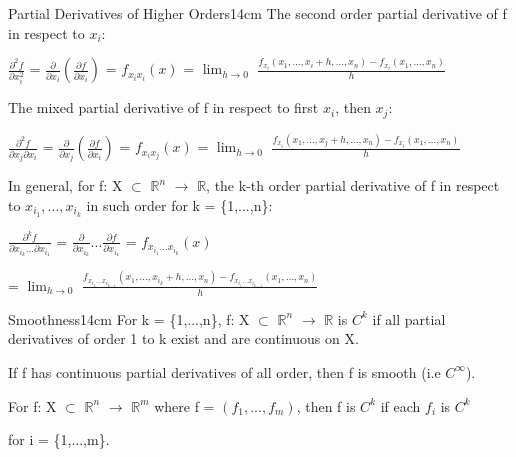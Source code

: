     \begin{definition}{Partial Derivatives of Higher Orders}{14cm}
        The {\color{lblue} second order partial derivative} of f
        in respect to $x_i$:

        \hspace{0.5cm}
        $\frac{\partial^2 f}{\partial x_i^2}$
        = $\frac{\partial}{\partial x_i} (\frac{\partial f}{\partial x_i})$
        = $f_{x_ix_i}(x)$
        = $\lim_{h \rightarrow 0}$
            $\frac{f_{x_i}(x_1,...,x_i+h,...,x_n) - f_{x_i}(x_1,...,x_n)}{h}$

        \vspace{0.3cm}

        The {\color{lblue} mixed partial derivative} of f
        in respect to first $x_i$, then $x_j$:

        \hspace{0.5cm}
        $\frac{\partial^2 f}{\partial x_j \partial x_i}$
        = $\frac{\partial}{\partial x_j} (\frac{\partial f}{\partial x_i})$
        = $f_{x_ix_j}(x)$
        = $\lim_{h \rightarrow 0}$
            $\frac{f_{x_i}(x_1,...,x_j+h,...,x_n) - f_{x_i}(x_1,...,x_n)}{h}$

        \vspace{0.3cm}
        
        In general, for f: X $\subset$ $\mathbb{R}^n$ $\rightarrow$ $\mathbb{R}$,
        the k-th order partial derivative of f in respect to
        $x_{i_1},...,x_{i_k}$ in such order for k = \{1,...,n\}:

        \hspace{0.5cm}
        $\frac{\partial^k f}{\partial x_{i_k} ... \partial x_{i_1}}$
        = $\frac{\partial}{\partial x_{i_k}} ... \frac{\partial f}{\partial x_{i_1}}$
        = $f_{x_{i_1}...x_{i_k}}(x)$

        \hspace{0.5cm}
        = $\lim_{h \rightarrow 0}$
            $\frac{f_{x_{i_1}...x_{i_{k-1}}}(x_1,...,x_{i_k}+h,...,x_n)
                    - f_{x_{i_1}...x_{i_{k-1}}}(x_1,...,x_n)}{h}$
    \end{definition}

    \vspace{0.5cm}



    \begin{definition}{Smoothness}{14cm}
        For k = \{1,...,n\},
        f: X $\subset$ $\mathbb{R}^n$ $\rightarrow$ $\mathbb{R}$ is $C^k$
        if all partial derivatives of order 1 to k exist and are continuous
        on X.

        \vspace{0.3cm}

        If f has continuous partial derivatives of all order, then
        f is {\color{lblue} smooth} (i.e $C^{\infty}$).

        \vspace{0.3cm}

        For f: X $\subset$ $\mathbb{R}^n$ $\rightarrow$ $\mathbb{R}^m$
        where f = $(f_1,...,f_m)$, then f is $C^k$ if each $f_i$ is $C^k$
        
        for i = \{1,...,m\}.
    \end{definition}

